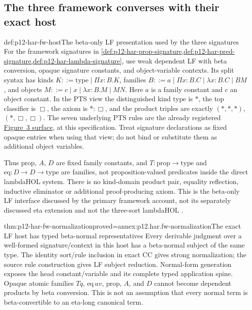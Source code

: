 \subsection{The three framework converses with their exact host}

\begin{hbdefinition}{def:p12-har-fw-host}{The beta-only LF presentation used by the three signatures}
For the framework signatures in
\cref{def:p12-har-prop-signature,def:p12-har-pred-signature,def:p12-har-lambda-signature},
use weak dependent LF with beta conversion, opaque signature constants,
and object-variable contexts. Its split syntax has kinds
\(K::=\mathrm{type}\mid\Pi x:B.K\), families
\(B::=a\mid\Pi x:B.C\mid\lambda x:B.C\mid BM\), and
objects \(M::=c\mid x\mid\lambda x:B.M\mid MN\).
Here \(a\) is a family constant and \(c\) an object constant.
In the PTS view the distinguished kind \(\mathrm{type}\) is
\(\ast\), the top classifier is \(\Box\), the axiom is
\(\ast:\Box\), and the product triples are exactly
\((\ast,\ast,\ast)\), \((\ast,\Box,\Box)\).
The seven underlying PTS rules are the already registered
\hyperref[sheet:p12-har-pts]{Figure~3 surface}, at this specification.
Treat signature declarations as fixed opaque entries when using that view;
do not bind or substitute them as additional object variables.

Thus \(\mathrm{prop}\), \(A\), \(D\) are fixed family constants,
and \(T:\mathrm{prop}\to\mathrm{type}\) and
\(\mathrm{eq}:D\to D\to\mathrm{type}\) are families, not
proposition-valued predicates inside the direct lambdaHOL system.
There is no kind-domain product pair, equality reflection, inductive
eliminator or additional proof-producing axiom. This is the beta-only
LF interface discussed by the primary framework account, not its
separately discussed eta extension and not the three-sort lambdaHOL
\cite[pp.~1160--1163]{BarendregtGeuvers2001}
\cite[sections~2.1 and 2.4]{HarperHonsellPlotkin1993LF}.
\end{hbdefinition}

\begin{hblemma}{thm:p12-har-fw-normalization}{proved=annex:p12.har.fw-normalization}{The exact LF host has typed beta-normal representatives}
Every derivable judgment over a well-formed signature/context in this
host has a beta-normal subject of the same type. The identity sort/rule
inclusion in exact CC gives strong normalization; the source rule
construction gives LF subject reduction. Normal-form generation exposes
the head constant/variable and its complete typed application spine.
Opaque atomic families \(Tq\), \(\mathrm{eq}\,uv\),
\(\mathrm{prop}\), \(A\), and \(D\) cannot become dependent
products by beta conversion. This is not an assumption that every
normal term is beta-convertible to an eta-long canonical term.
\end{hblemma}

